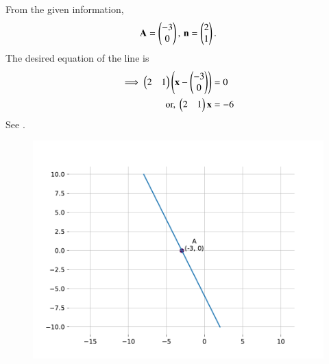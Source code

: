 		From the given information,
\begin{align}		
	\mathbf{A}=\begin{pmatrix}-3\\0\end{pmatrix},\,
\mathbf{n} = \begin{pmatrix}2 \\1\end{pmatrix}.
\end{align}
The desired equation of the line is
\begin{align}
\implies	\begin{pmatrix} 2 & 1 \end{pmatrix} \left( \mathbf{x} - \begin{pmatrix} -3 \\ 0\end{pmatrix}\right) &= 0  \\
	\text{or, }	\begin{pmatrix} 2 & 1\end{pmatrix} \mathbf{x}  &= -6
        \label{eq:chapters/11/10/2/5/1}
\end{align}
See .
\begin{figure}[H]
	\begin{center}
		\includegraphics[width=0.75\columnwidth]{chapters/11/10/2/5/figs/fig.pdf}
	\end{center}
\caption{}
\label{fig:chapters/11/10/2/5/Fig1}
\end{figure}


